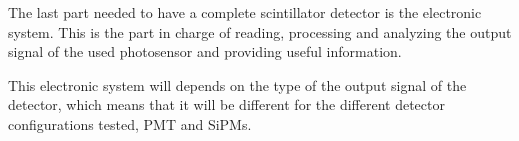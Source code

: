 The last part needed to have a complete scintillator detector is the electronic system. This is the part in charge of reading, processing and analyzing the output signal of the used photosensor and providing useful information.

This electronic system will depends on the type of the output signal of the detector, which means that it will be different for the different detector configurations tested,  PMT and SiPMs.


 